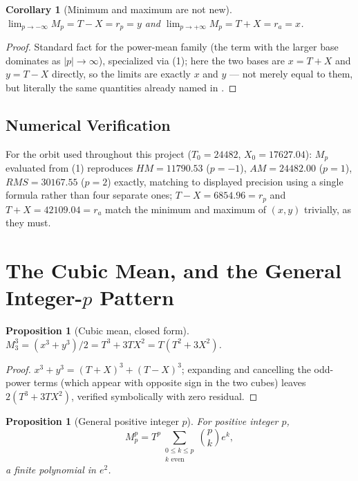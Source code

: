\documentclass[12pt]{amsart}
\theoremstyle{plain}
\newtheorem{proposition}[theorem]{Proposition}
\newtheorem{corollary}[theorem]{Corollary}
\theoremstyle{remark}
\begin{document}
\begin{corollary}[Minimum and maximum are not new]\label{cor:minmax}
$\lim_{p\to-\infty}M_p=T-X=r_p=y$ and $\lim_{p\to+\infty}M_p=T+X=r_a=x$.
\end{corollary}

\begin{proof}
Standard fact for the power-mean family (the term with the larger base dominates as $|p|\to\infty$), specialized via (1); here the two bases are $x=T+X$ and $y=T-X$ directly, so the limits are exactly $x$ and $y$ --- not merely equal to them, but literally the same quantities already named in \cite{Ebert2026Table}.
\end{proof}

\subsection*{Numerical Verification}
For the orbit used throughout this project ($T_0=24482$, $X_0=17627.04$): $M_p$ evaluated from (1) reproduces $HM=11790.53$ ($p=-1$), $AM=24482.00$ ($p=1$), $RMS=30167.55$ ($p=2$) exactly, matching \cite{Ebert2026FourMeans} to displayed precision using a single formula rather than four separate ones; $T-X=6854.96=r_p$ and $T+X=42109.04=r_a$ match the minimum and maximum of $(x,y)$ trivially, as they must.

\section{The Cubic Mean, and the General Integer-$p$ Pattern}

\begin{proposition}[Cubic mean, closed form]\label{prop:cubic}
$M_3^3=(x^3+y^3)/2=T^3+3TX^2=T(T^2+3X^2)$.
\end{proposition}

\begin{proof}
$x^3+y^3=(T+X)^3+(T-X)^3$; expanding and cancelling the odd-power terms (which appear with opposite sign in the two cubes) leaves $2(T^3+3TX^2)$, verified symbolically with zero residual.
\end{proof}

\begin{proposition}[General positive integer $p$]\label{prop:general}
For positive integer $p$,
\[
M_p^p=T^p\!\!\sum_{\substack{0\le k\le p\\k\text{ even}}}\!\!\binom pk e^k,
\]
a finite polynomial in $e^2$.
\end{proposition}
\end{document}
